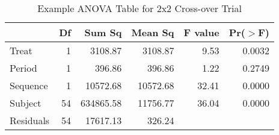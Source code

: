 \begin{table}[ht]
\centering
\caption{Example ANOVA Table for 2x2 Cross-over Trial}
\centering
\begin{tabular}{lrrrrr}
  \hline
 & Df & Sum Sq & Mean Sq & F value & Pr($>$F) \\ 
  \hline
Treat & 1 & 3108.87 & 3108.87 & 9.53 & 0.0032 \\ 
  Period & 1 & 396.86 & 396.86 & 1.22 & 0.2749 \\ 
  Sequence & 1 & 10572.68 & 10572.68 & 32.41 & 0.0000 \\ 
  Subject & 54 & 634865.58 & 11756.77 & 36.04 & 0.0000 \\ 
  Residuals & 54 & 17617.13 & 326.24 &  &  \\ 
   \hline
\end{tabular}
\label{anovaTable}
\end{table}

